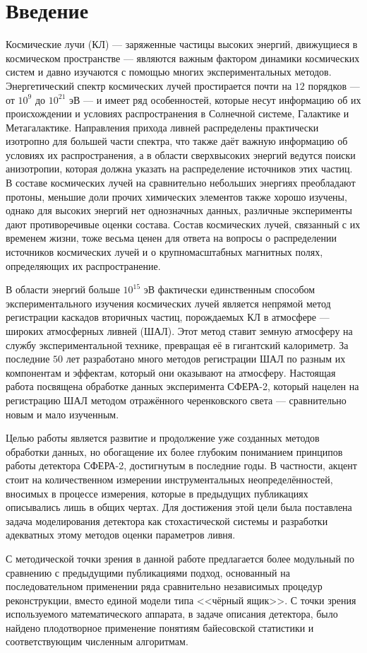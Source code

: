 \chapter*{Введение}

Космические лучи (КЛ) --- заряженные частицы высоких энергий, движущиеся в космическом пространстве --- являются важным фактором динамики космических систем и давно изучаются с помощью многих экспериментальных методов. Энергетический спектр космических лучей простирается почти на $12$ порядков --- от $10^{9}$ до $10^{21}$ эВ --- и имеет ряд особенностей, которые несут информацию об их происхождении и условиях распространения в Солнечной системе, Галактике и Метагалактике. Направления прихода ливней распределены практически изотропно для большей части спектра, что также даёт важную информацию об условиях их распространения, а в области сверхвысоких энергий ведутся поиски анизотропии, которая должна указать на распределение источников этих частиц. В составе космических лучей на сравнительно небольших энергиях преобладают протоны, меньшие доли прочих химических элементов также хорошо изучены, однако для высоких энергий нет однозначных данных, различные эксперименты дают противоречивые оценки состава. Состав космических лучей, связанный с их временем жизни, тоже весьма ценен для ответа на вопросы о распределении источников космических лучей и о крупномасштабных магнитных полях, определяющих их распространение.

В области энергий больше $10^{15}$ эВ фактически единственным способом экспериментального изучения космических лучей является непрямой метод регистрации каскадов вторичных частиц, порождаемых КЛ в атмосфере --- широких атмосферных ливней (ШАЛ). Этот метод ставит земную атмосферу на службу экспериментальной технике, превращая её в гигантский калориметр. За последние $50$ лет разработано много методов регистрации ШАЛ по разным их компонентам и эффектам, который они оказывают на атмосферу. Настоящая работа посвящена обработке данных эксперимента СФЕРА-2, который нацелен на регистрацию ШАЛ методом отражённого черенковского света --- сравнительно новым и мало изученным.

Целью работы является развитие и продолжение уже созданных методов обработки данных, но обогащение их более глубоким пониманием принципов работы детектора СФЕРА-2, достигнутым в последние годы. В частности, акцент стоит на количественном измерении инструментальных неопределённостей, вносимых в процессе измерения, которые в предыдущих публикациях описывались лишь в общих чертах. Для достижения этой цели была поставлена задача моделирования детектора как стохастической системы и разработки адекватных этому методов оценки параметров ливня.

С методической точки зрения в данной работе предлагается более модульный по сравнению с предыдущими публикациями подход, основанный на последовательном применении ряда сравнительно независимых процедур реконструкции, вместо единой модели типа <<чёрный ящик>>. С точки зрения используемого математического аппарата, в задаче описания детектора, было найдено плодотворное применение понятиям байесовской статистики и соответствующим численным алгоритмам.
